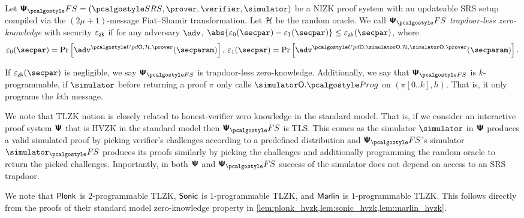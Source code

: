 \begin{definition}
  \label{def:tls}
  Let 
  $\psfs = (\SRScer, \prover, \verifier, \simulator)$ be a NIZK proof system with an updateable SRS setup compiled via the $(2\mu + 1)$-message Fiat--Shamir transformation. Let $\mathcal{H}$ be the random oracle. 
  We call $\psfs$ \emph{trapdoor-less zero-knowledge} with security $\varepsilon_{\mathsf{zk}}$ if for any
  adversary $\adv$, $\abs{\eps_0(\secpar) - \eps_1(\secpar)} \leq \epszk(\secpar)$, where
  \begin{align*}
    \eps_0 (\secpar) = \Pr\left[ \adv^{\initU, \ro, \prover} (\secparam) \right],\,
    \eps_1 (\secpar)=  \Pr \left[\adv^{\initU, \simulator\oracleo.\ro, \simulator\oracleo.\prover} (\secparam) \right].
  \end{align*}
  
  If $\epszk(\secpar)$ is negligible, we say $\ps_{\fs}$ is trapdoor-less zero-knowledge. Additionally, we say that $\ps_{\fs}$ is $k$-programmable, if  $\simulator$ before returning a proof $\pi$ only calls $\simulator\oracleo.\prog$ on $(\pi[0..k],h)$. That is, it only programs the $k$th message.
  \end{definition}

  
\begin{remark}
  We note that TLZK notion is closely related to honest-verifier zero knowledge in the
  standard model. That is, if we consider an interactive proof system $\bm{\mathsf{\Psi}}$
  that is HVZK in the standard model then $\proofsystem_\fs$ is TLS. This comes as the simulator $\simulator$ in
  $\bm{\mathsf{\Psi}}$ produces a valid simulated proof by picking verifier's challenges
  according to a predefined distribution and $\proofsystem_\fs$'s simulator
  $\simulator_\fs$ produces its proofs similarly by picking the challenges and
  additionally programming the random oracle to return the picked
  challenges. Importantly, in both $\bm{\mathsf{\Psi}}$ and $\proofsystem_\fs$ success of
  the simulator does not depend on access to an SRS trapdoor.
\end{remark}

We note that $\textnormal{\textsf{Plonk}}$ is $2$-programmable TLZK, ${\textnormal{\textsf{Sonic}}}$ is $1$-programmable TLZK,
and ${\textnormal{\textsf{Marlin}}}$ is $1$-programmable TLZK. This follows directly from the proofs of
their standard model zero-knowledge property in
\cref{lem:plonk_hvzk,lem:sonic_hvzk,lem:marlin_hvzk}.

